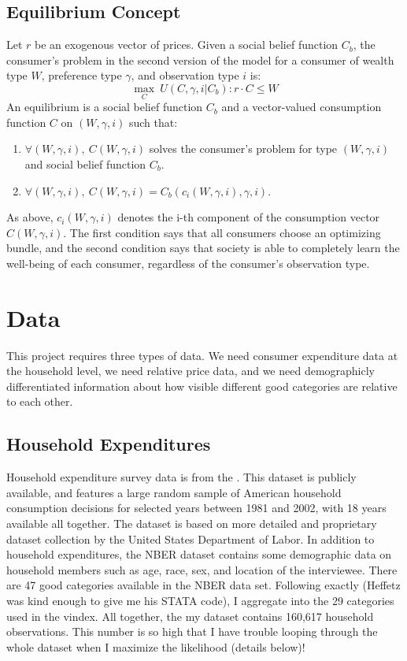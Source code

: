 \documentclass[12pt]{article}
\begin{document}
\subsection{Equilibrium Concept}
Let $r$ be an exogenous vector of prices.  
Given a social belief function $C_b$, the consumer's problem in the second version of the model for a consumer of wealth type $W$, preference type $\gamma$, and observation type $i$ is:
\[ \max_C \ U(C,\gamma,i|C_b) :  r\cdot C \le W\]
An equilibrium is a social belief function $C_b$ and a vector-valued consumption function $C$ on $(W,\gamma,i)$ such that:
\begin{enumerate}
	\item $\forall (W,\gamma,i), \ C(W,\gamma,i)$ solves the consumer's problem for type $(W,\gamma,i)$ and social belief function $C_b$.
	\item $\forall (W,\gamma,i), \ C(W,\gamma,i) = C_b(c_i(W,\gamma,i),\gamma,i).$
\end{enumerate}
As above, $c_i(W,\gamma,i)$ denotes the i-th component of the consumption vector $C(W,\gamma,i)$.
The first condition says that all consumers choose an optimizing  bundle, and the second condition says that society is able to completely learn the well-being of each consumer, regardless of the consumer's observation type.
\section{Data}
This project requires three types of data.  We need consumer expenditure data at the household level, we need relative price data, and we need demographicly differentiated information about how visible different good categories are relative to each other. 
\subsection{Household Expenditures}
Household expenditure survey data is from the \citet{NBERCEX2011}.    
This dataset is publicly available, and features a large random sample of American household consumption decisions for selected years between 1981 and 2002, with 18 years available all together.  
The dataset is based on more detailed and proprietary dataset collection by the United States Department of Labor. 
In addition to household expenditures, the NBER dataset contains some demographic data on household members such as age, race, sex, and location of the interviewee.  
There are 47 good categories available in the NBER data set.
Following \citet{Heffetz2011} exactly (Heffetz was kind enough to give me his STATA code), I aggregate into the 29 categories used in the vindex.
All together, the my dataset contains 160,617 household observations.
This number is so high that I have trouble looping through the whole dataset when I maximize the likelihood (details below)!
\end{document}
